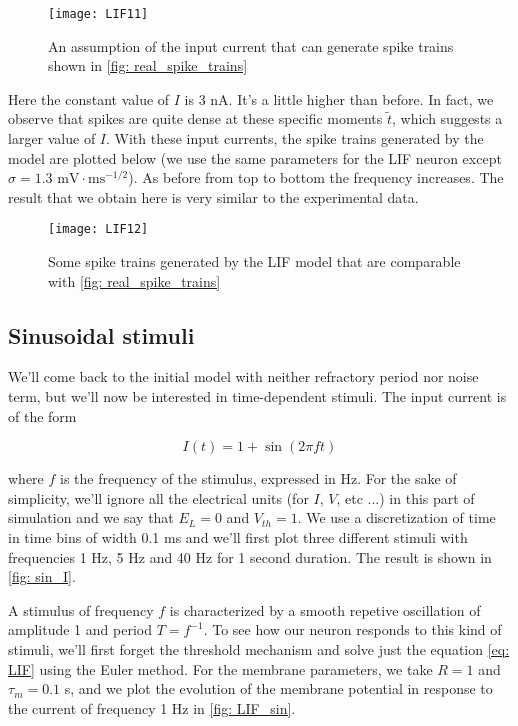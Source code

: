 \vspace{-1em}
\begin{figure}[H]
  \centering
  \texttt{[image: LIF11]}
  \caption{An assumption of the input current that can generate 
           spike trains shown in \autoref{fig: real_spike_trains}}
\end{figure}

\newpage
Here the constant value of $I$ is 3 nA. It's a little higher than before. 
In fact, we observe that spikes are quite dense at these specific moments 
$\tilde{t}$, which suggests a larger value of $I$. With these input currents,
the spike trains generated by the model are plotted below
(we use the same parameters for the LIF neuron except 
$\sigma = 1.3$ $\mathrm{mV\cdot ms^{-1/2}}$). 
As before from top to bottom the frequency increases. The result that we 
obtain here is very similar to the experimental data.

\begin{figure}[H]
  \centering
  \texttt{[image: LIF12]}
  \caption{Some spike trains generated by the LIF model that are comparable
           with \autoref{fig: real_spike_trains}}
  \label{fig: sim_spike_trains}
\end{figure}

\subsection{Sinusoidal stimuli}

We'll come back to the initial model with neither refractory period nor 
noise term, but we'll now be interested in time-dependent stimuli.
The input current is of the form 

\begin{equation}
  I(t) = 1 + \sin(2\pi ft)
\end{equation}

\noindent
where $f$ is the frequency of the stimulus, expressed in Hz. For the sake of 
simplicity, we'll ignore all the electrical units (for $I$, $V$, etc ...) 
in this part of simulation and we say that $E_L = 0$ and $V_{th} = 1$.  
We use a discretization of time in time bins of width 0.1 ms and we'll first 
plot three different stimuli with frequencies 1 Hz, 5 Hz and 40 Hz for 1 
second duration. The result is shown in \autoref{fig: sin_I}.

A stimulus of frequency $f$ is characterized by a smooth repetive oscillation
of amplitude 1 and period $T = f^{-1}$. To see how our neuron responds to
this kind of stimuli, we'll first forget the threshold mechanism and 
solve just the equation \eqref{eq: LIF} using the Euler method. 
For the membrane parameters, we take $R = 1$ and $\tau_m = 0.1$ s, and we plot
the evolution of the membrane potential in response to the current of 
frequency 1 Hz in \autoref{fig: LIF_sin}.

